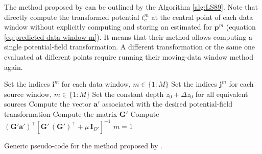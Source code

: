 The method proposed by \cite{leao-silva1989} can be outlined by the Algorithm \ref{alg:LS89}.
Note that \cite{leao-silva1989} directly compute the transformed potential $t^{m}_{c}$ at the central point of
each data window without explicitly computing and storing an estimated for $\mathbf{p}^{m}$ (equation \ref{eq:predicted-data-window-m}).
It means that their method allows computing a single potential-field transformation. 
A different transformation or the same one evaluated at different points require running their moving-data window method again.

\begin{algorithm}
	\Input{}
	Set the indices $\mathbf{i}^{m}$ for each data window, $m \in \{ 1 : M \}$ \;
	Set the indices $\mathbf{j}^{m}$ for each source window, $m \in \{ 1 : M \}$ \;
	Set the constant depth $z_{0} + \Delta z_{0}$ for all equivalent sources \;
	Compute the vector $\mathbf{a}'$ associated with the desired potential-field transformation \;
	Compute the matrix $\mathbf{G}'$ \;
	Compute $\left( \mathbf{G}' \mathbf{a}' \right)^{\top} 
	\left[ \mathbf{G}' \, \left( \mathbf{G}' \right)^{\top} + \mu \, \mathbf{I}_{D'} \right]^{-1}$ \;
	$m = 1$ \;
	\caption{Generic pseudo-code for the method proposed by \cite{leao-silva1989}.}
	\label{alg:LS89}
\end{algorithm}

